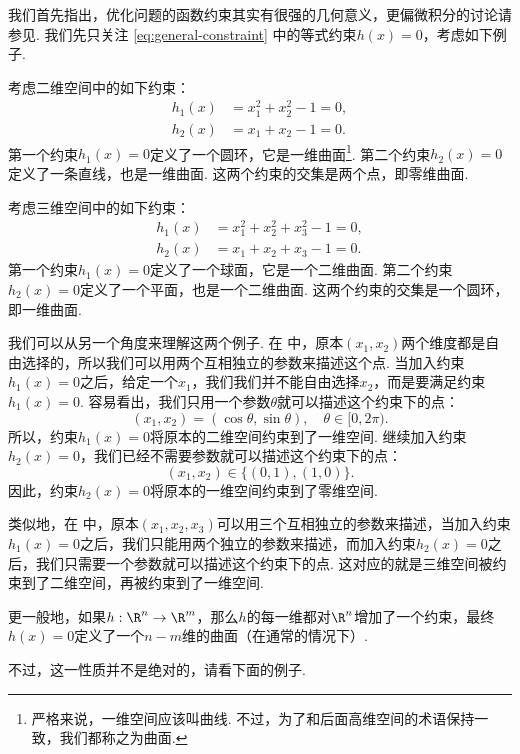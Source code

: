 我们首先指出，优化问题的函数约束其实有很强的几何意义，更偏微积分的讨论请参见. 我们先只关注 \eqref{eq:general-constraint} 中的等式约束$h(x)=0$，考虑如下例子. 

\begin{example}[二维空间中的约束]\label{ex:2d-constraint}
考虑二维空间中的如下约束：
\begin{align*}
    h_1(x)&=x_1^2+x_2^2-1=0,\\
    h_2(x)&=x_1+x_2-1=0.
\end{align*}
第一个约束$h_1(x)=0$定义了一个圆环，它是一维曲面\footnote{严格来说，一维空间应该叫曲线. 不过，为了和后面高维空间的术语保持一致，我们都称之为曲面. }. 第二个约束$h_2(x)=0$定义了一条直线，也是一维曲面. 这两个约束的交集是两个点，即零维曲面.
\end{example}

\begin{example}[三维空间中的约束]\label{ex:3d-constraint}
考虑三维空间中的如下约束：
\begin{align*}
    h_1(x)&=x_1^2+x_2^2+x_3^2-1=0,\\
    h_2(x)&=x_1+x_2+x_3-1=0.
\end{align*}
第一个约束$h_1(x)=0$定义了一个球面，它是一个二维曲面. 第二个约束$h_2(x)=0$定义了一个平面，也是一个二维曲面. 这两个约束的交集是一个圆环，即一维曲面.
\end{example}

我们可以从另一个角度来理解这两个例子. 在 中，原本$(x_1,x_2)$两个维度都是自由选择的，所以我们可以用两个互相独立的参数来描述这个点. 当加入约束$h_1(x)=0$之后，给定一个$x_1$，我们我们并不能自由选择$x_2$，而是要满足约束$h_1(x)=0$. 容易看出，我们只用一个参数$\theta$就可以描述这个约束下的点：
\[
(x_1,x_2)=(\cos\theta,\sin\theta),\quad \theta\in[0,2\pi).
\]
所以，约束$h_1(x)=0$将原本的二维空间约束到了一维空间. 继续加入约束$h_2(x)=0$，我们已经不需要参数就可以描述这个约束下的点：
\[
(x_1,x_2)\in\{(0,1),(1,0)\}.
\]
因此，约束$h_2(x)=0$将原本的一维空间约束到了零维空间.

类似地，在 中，原本$(x_1,x_2,x_3)$可以用三个互相独立的参数来描述，当加入约束$h_1(x)=0$之后，我们只能用两个独立的参数来描述，而加入约束$h_2(x)=0$之后，我们只需要一个参数就可以描述这个约束下的点. 这对应的就是三维空间被约束到了二维空间，再被约束到了一维空间.

更一般地，如果$h:\R^n\to\R^m$，那么$h$的每一维都对$\R^n$增加了一个约束，最终$h(x)=0$定义了一个$n-m$维的曲面（在通常的情况下）. 

不过，这一性质并不是绝对的，请看下面的例子. 

